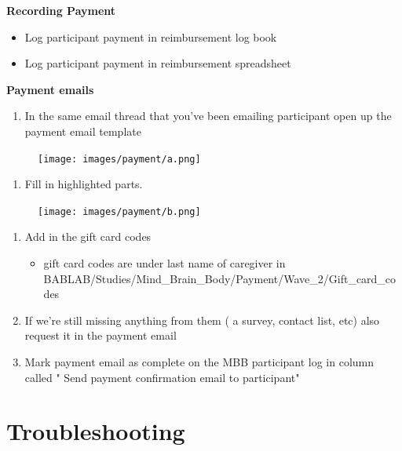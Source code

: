 \documentclass[
]{book}
\providecommand{\tightlist}{%
  \setlength{\itemsep}{0pt}\setlength{\parskip}{0pt}}
\begin{document}
\textbf{Recording Payment}

\begin{itemize}
\tightlist
\item
  Log participant payment in reimbursement log book
\item
  Log participant payment in reimbursement spreadsheet
\end{itemize}

\textbf{Payment emails}

\begin{enumerate}
\def\labelenumi{\arabic{enumi}.}
\tightlist
\item
  In the same email thread that you've been emailing participant open up the payment email template
\end{enumerate}

\begin{figure}
\centering
\texttt{[image: images/payment/a.png]}
\caption{}
\end{figure}

\begin{enumerate}
\def\labelenumi{\arabic{enumi}.}
\setcounter{enumi}{1}
\tightlist
\item
  Fill in highlighted parts.
\end{enumerate}

\begin{figure}
\centering
\texttt{[image: images/payment/b.png]}
\caption{}
\end{figure}

\begin{enumerate}
\def\labelenumi{\arabic{enumi}.}
\setcounter{enumi}{2}
\item
  Add in the gift card codes

  \begin{itemize}
  \tightlist
  \item
    gift card codes are under last name of caregiver in BABLAB/Studies/Mind\_Brain\_Body/Payment/Wave\_2/Gift\_card\_codes
  \end{itemize}
\item
  If we're still missing anything from them ( a survey, contact list, etc) also request it in the payment email
\item
  Mark payment email as complete on the MBB participant log in column called " Send payment confirmation email to participant"
\end{enumerate}

\hypertarget{troubleshooting}{%
\chapter{Troubleshooting}\label{troubleshooting}}
\end{document}
